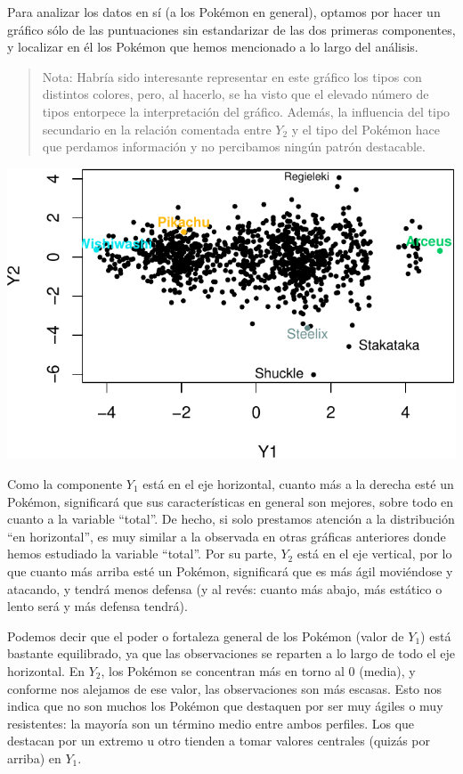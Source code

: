 \documentclass[
  12pt,
]{extreport}
\begin{document}
Para analizar los datos en sí (a los Pokémon en general), optamos por
hacer un gráfico sólo de las puntuaciones sin estandarizar de las dos
primeras componentes, y localizar en él los Pokémon que hemos mencionado
a lo largo del análisis.

\begin{quote}
Nota: Habría sido interesante representar en este gráfico los tipos con
distintos colores, pero, al hacerlo, se ha visto que el elevado número
de tipos entorpece la interpretación del gráfico. Además, la influencia
del tipo secundario en la relación comentada entre \(Y_2\) y el tipo del
Pokémon hace que perdamos información y no percibamos ningún patrón
destacable.
\end{quote}

\begin{center}
\includegraphics{trabajo_files/figure-pdf/unnamed-chunk-38-1.pdf}
\end{center}

Como la componente \(Y_1\) está en el eje horizontal, cuanto más a la
derecha esté un Pokémon, significará que sus características en general
son mejores, sobre todo en cuanto a la variable ``total''. De hecho, si
solo prestamos atención a la distribución ``en horizontal'', es muy
similar a la observada en otras gráficas anteriores donde hemos
estudiado la variable ``total''. Por su parte, \(Y_2\) está en el eje
vertical, por lo que cuanto más arriba esté un Pokémon, significará que
es más ágil moviéndose y atacando, y tendrá menos defensa (y al revés:
cuanto más abajo, más estático o lento será y más defensa tendrá).

Podemos decir que el poder o fortaleza general de los Pokémon (valor de
\(Y_1\)) está bastante equilibrado, ya que las observaciones se reparten
a lo largo de todo el eje horizontal. En \(Y_2\), los Pokémon se
concentran más en torno al 0 (media), y conforme nos alejamos de ese
valor, las observaciones son más escasas. Esto nos indica que no son
muchos los Pokémon que destaquen por ser muy ágiles o muy resistentes:
la mayoría son un término medio entre ambos perfiles. Los que destacan
por un extremo u otro tienden a tomar valores centrales (quizás por
arriba) en \(Y_1\).
\end{document}
